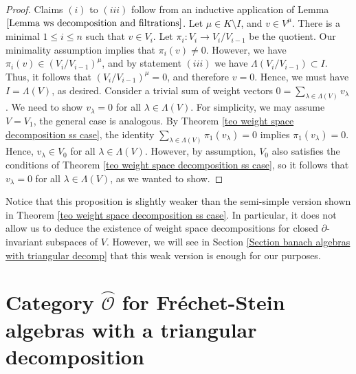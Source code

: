 \documentclass{amsart}
\newcommand{\OX}{\mathcal{O}}
\begin{document}
\begin{proof}
Claims $(i)$ to $(iii)$ follow from an inductive application of Lemma $\ref{Lemma ws decomposition and filtrations}$. Let $\mu \in K\setminus I$, and $v\in V^{\mu}$. There is a minimal $1\leq i \leq n$ such that $v\in V_i$. Let $\pi_i:V_i\rightarrow V_i/V_{i-1}$ be the quotient. Our minimality assumption implies that $\pi_i(v)\neq 0$. However, we have $\pi_i(v)\in (V_i/V_{i-1})^{\mu}$, and by statement $(iii)$ we have $\Lambda(V_i/V_{i-1})\subset I$. Thus, it follows that $(V_i/V_{i-1})^{\mu}=0$, and therefore $v=0$. Hence, we must have $I=\Lambda(V)$, as desired. Consider a trivial sum of weight vectors $0=\sum_{\lambda\in\Lambda(V)}v_{\lambda}$. We need to show $v_{\lambda}=0$ for all $\lambda\in\Lambda(V)$. For simplicity, we may assume $V=V_1$, the general case is analogous. By Theorem \ref{teo weight space decomposition ss case}, the identity $\sum_{\lambda\in\Lambda(V)}\pi_1(v_{\lambda})=0$ implies $\pi_1(v_{\lambda})=0$. Hence, $v_{\lambda}\in V_0$ for all $\lambda\in\Lambda(V)$. However, by assumption, $V_0$ also satisfies the conditions of Theorem \ref{teo weight space decomposition ss case}, so it follows that $v_{\lambda}=0$ for all $\lambda\in\Lambda(V)$, as we wanted to show.
\end{proof}
Notice that this proposition is slightly weaker than the semi-simple version shown in Theorem \ref{teo weight space decomposition ss case}. In particular, it does not allow us to deduce the existence of weight space decompositions for closed $\partial$-invariant subspaces of $V$. However, we will see in Section \ref{Section banach algebras with triangular decomp} that this weak version is enough for our purposes.
\section{\texorpdfstring{Category $\wideparen{\OX}$ for Fréchet-Stein algebras with a triangular decomposition}{}}\label{Section decompositions}
\end{document}
